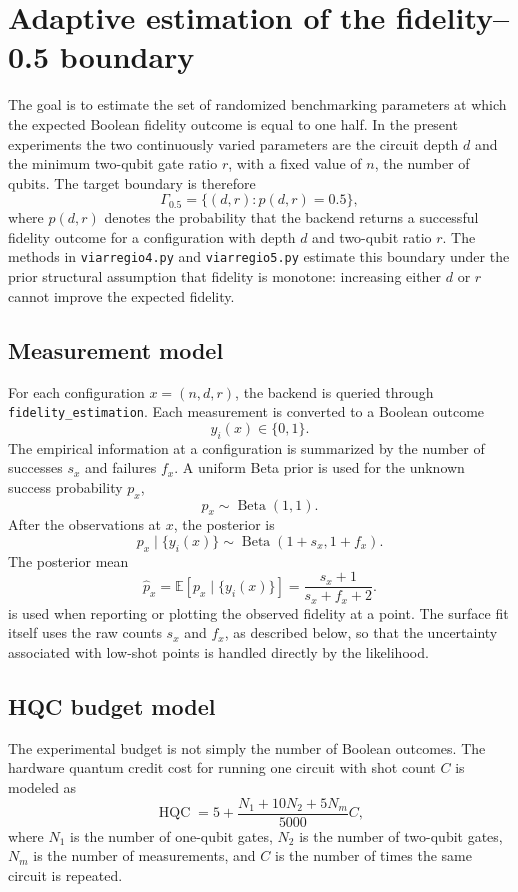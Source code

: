 \section{Adaptive estimation of the fidelity--0.5 boundary}

The goal is to estimate the set of randomized benchmarking parameters at which
the expected Boolean fidelity outcome is equal to one half.  In the present
experiments the two continuously varied parameters are the circuit depth \(d\)
and the minimum two-qubit gate ratio \(r\), with a fixed value of \(n\), the
number of qubits.  The target boundary is therefore
\[
    \Gamma_{0.5}
    =
    \{(d,r): p(d,r) = 0.5\},
\]
where \(p(d,r)\) denotes the probability that the backend returns a successful
fidelity outcome for a configuration with depth \(d\) and two-qubit ratio \(r\).
The methods in \texttt{viarregio4.py} and \texttt{viarregio5.py} estimate this
boundary under the prior structural assumption that fidelity is monotone:
increasing either \(d\) or \(r\) cannot improve the expected fidelity.

\subsection{Measurement model}

For each configuration \(x=(n,d,r)\), the backend is queried through
\texttt{fidelity\_estimation}.  Each measurement is converted to a Boolean
outcome
\[
    y_i(x) \in \{0,1\}.
\]
The empirical information at a configuration is summarized by the number of
successes \(s_x\) and failures \(f_x\).  A uniform Beta prior is used for the
unknown success probability \(p_x\),
\[
    p_x \sim \operatorname{Beta}(1,1).
\]
After the observations at \(x\), the posterior is
\[
    p_x \mid \{y_i(x)\}
    \sim
    \operatorname{Beta}(1+s_x, 1+f_x).
\]
The posterior mean
\[
    \widehat p_x
    =
    \mathbb{E}[p_x \mid \{y_i(x)\}]
    =
    \frac{s_x+1}{s_x+f_x+2}.
\]
is used when reporting or plotting the observed fidelity at a point.  The
surface fit itself uses the raw counts \(s_x\) and \(f_x\), as described below,
so that the uncertainty associated with low-shot points is handled directly by
the likelihood.

\subsection{HQC budget model}

The experimental budget is not simply the number of Boolean outcomes.  The
hardware quantum credit cost for running one circuit with shot count \(C\) is
modeled as
\[
    \operatorname{HQC}
    =
    5
    +
    \frac{N_1 + 10N_2 + 5N_m}{5000} C,
\]
where \(N_1\) is the number of one-qubit gates, \(N_2\) is the number of
two-qubit gates, \(N_m\) is the number of measurements, and \(C\) is the number
of times the same circuit is repeated.

